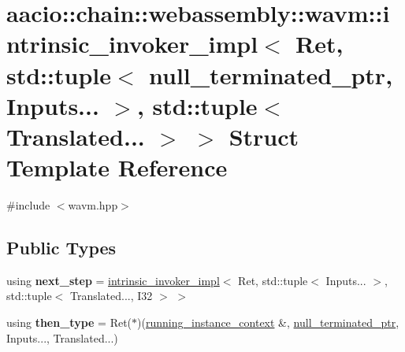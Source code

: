 \hypertarget{structaacio_1_1chain_1_1webassembly_1_1wavm_1_1intrinsic__invoker__impl_3_01_ret_00_01std_1_1tup91d956aba0f21670c5912ef4ca618242}{}\section{aacio\+:\+:chain\+:\+:webassembly\+:\+:wavm\+:\+:intrinsic\+\_\+invoker\+\_\+impl$<$ Ret, std\+:\+:tuple$<$ null\+\_\+terminated\+\_\+ptr, Inputs... $>$, std\+:\+:tuple$<$ Translated... $>$ $>$ Struct Template Reference}
\label{structaacio_1_1chain_1_1webassembly_1_1wavm_1_1intrinsic__invoker__impl_3_01_ret_00_01std_1_1tup91d956aba0f21670c5912ef4ca618242}


{\ttfamily \#include $<$wavm.\+hpp$>$}

\subsection*{Public Types}
\begin{DoxyCompactItemize}
\item 
\mbox{\label{structaacio_1_1chain_1_1webassembly_1_1wavm_1_1intrinsic__invoker__impl_3_01_ret_00_01std_1_1tup91d956aba0f21670c5912ef4ca618242_a02df18d7e5161af6e43c3b3e5d5cee8e}} 
using {\bfseries next\+\_\+step} = \mbox{\hyperlink{structaacio_1_1chain_1_1webassembly_1_1wavm_1_1intrinsic__invoker__impl}{intrinsic\+\_\+invoker\+\_\+impl}}$<$ Ret, std\+::tuple$<$ Inputs... $>$, std\+::tuple$<$ Translated..., I32 $>$ $>$
\item 
\mbox{\label{structaacio_1_1chain_1_1webassembly_1_1wavm_1_1intrinsic__invoker__impl_3_01_ret_00_01std_1_1tup91d956aba0f21670c5912ef4ca618242_ae5f7ceabb2317312ad0b1bf5c66f93d9}} 
using {\bfseries then\+\_\+type} = Ret($\ast$)(\mbox{\hyperlink{structaacio_1_1chain_1_1webassembly_1_1wavm_1_1running__instance__context}{running\+\_\+instance\+\_\+context}} \&, \mbox{\hyperlink{structaacio_1_1chain_1_1null__terminated__ptr}{null\+\_\+terminated\+\_\+ptr}}, Inputs..., Translated...)
\end{DoxyCompactItemize}
